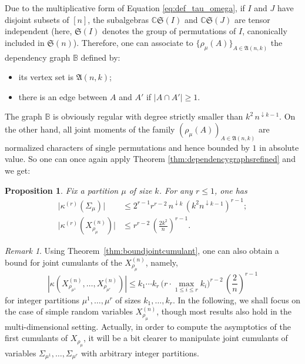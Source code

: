 \documentclass[12pt,a4paper,reqno]{amsart}
\newtheorem{proposition}[lemma]{Proposition}
\theoremstyle{remark}
\newtheorem{remark}[lemma]{Remark}
\newcommand{\C}{\mathbb{C}}
\newcommand{\SubGraph}{X^{(n)}}
\newcommand{\fall}[1]{^{\downarrow #1}}
\newcommand{\arr}{\mathfrak{A}}
\newcommand{\sym}{\mathfrak{S}}
\def\B{\mathbb{B}}
\begin{document}
Due to the multiplicative form of Equation \eqref{eq:def_tau_omega}, if $I$ and $J$ have disjoint subsets of $[n]$, the subalgebras $\C\sym(I)$ and $\C\sym(J)$ are tensor independent (here, $\sym(I)$ denotes the group of permutations of $I$, canonically included in $\sym(n)$). Therefore, one can associate to $\{\rho_{\mu}(A)\}_{A \in \arr(n,k)}$
the dependency graph $\B$ defined by: \vspace{2mm}
\begin{itemize}
    \item its vertex set is $\arr(n,k)$;\vspace{2mm}
    \item there is an edge between $A$ and $A'$ if  $|A \cap A'| \ge 1$.\vspace{2mm}
\end{itemize}
The graph $\B$ is obviously regular with degree strictly smaller than $k^{2}\,n\fall{k-1}$. On the other hand, all joint moments of the family $(\rho_{\mu}(A))_{A \in \arr(n,k)}$ are normalized characters of single permutations and hence bounded by $1$ in absolute value. So one can once again apply Theorem \ref{thm:dependencygraphsrefined} and we get:

\begin{proposition}\label{prop:boundcumulantcharacter} 
Fix a partition $\mu$ of size $k$. For any $r\le 1$, one has
\begin{align*} 
\big| \kappa^{(r)}(\varSigma_\mu) \big| &\le 2^{r-1} r^{r-2}\,  n\fall k\, (k^{2} n\fall{k-1})^{r-1};\\
\big| \kappa^{(r)}(\SubGraph_{\rho_\mu}) \big| &\le r^{r-2}\,  \left(\frac{2k^{2}}{n} \right)^{r-1}.
\end{align*}
\end{proposition}

\begin{remark}
Using Theorem~\ref{thm:boundjointcumulant}, one can also obtain a bound for joint cumulants of the $\SubGraph_{\rho_\mu}$, namely,
$$\left| \kappa\!\left (\SubGraph_{\rho_{\mu^{1}}},\dots,\SubGraph_{\rho_{\mu^{r}}}\right) \right| \le k_1 \cdots k_r\, \big(r \cdot \max_{1 \le i \le r} k_i \big)^{r-2} \, \left(\frac{2}{n}\right)^{r-1}$$
for integer partitions $\mu^1,\dots,\mu^r$ of sizes $k_1,\ldots,k_r$. In the following, we shall focus on the case of simple random variables $\SubGraph_{\rho_{\mu}}$, though most results also hold in the multi-dimensional setting. Actually, in order to compute the asymptotics of the first cumulants of $X_{\rho_{\mu}}$, it will be a bit clearer to manipulate joint cumulants of variables $\varSigma_{\mu^{1}},\ldots,\varSigma_{\mu^{r}}$ with arbitrary integer partitions.
\end{remark}
\bigskip
\end{document}
